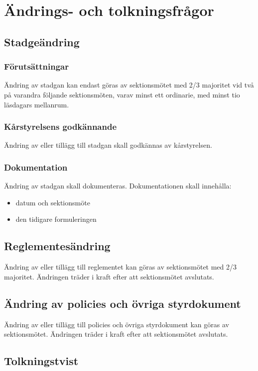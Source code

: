 \section{Ändrings- och tolkningsfrågor}

\subsection{Stadgeändring}

\subsubsection{Förutsättningar}
Ändring av stadgan kan endast göras av sektionsmötet med 2/3 majoritet vid två på varandra följande sektionsmöten, varav minst ett ordinarie, med minst tio läsdagars mellanrum.

\subsubsection{Kårstyrelsens godkännande}
Ändring av eller tillägg till stadgan skall godkännas av kårstyrelsen.
\subsubsection{Dokumentation}
Ändring av stadgan skall dokumenteras. Dokumentationen skall innehålla:
\begin{itemize}
	\item datum och sektionsmöte
	\item den tidigare formuleringen
\end{itemize}

\subsection{Reglementesändring}
Ändring av eller tillägg till reglementet kan göras av sektionsmötet med 2/3 majoritet. Ändringen träder i kraft efter att sektionsmötet avslutats.

\subsection{Ändring av policies och övriga styrdokument}
Ändring av eller tillägg till policies och övriga styrdokument kan göras av sektionsmötet. Ändringen träder i kraft efter att sektionsmötet avslutats.

\subsection{Tolkningstvist}

